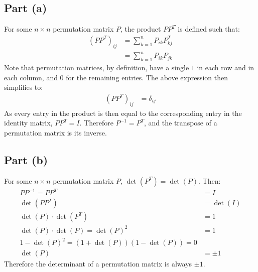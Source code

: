 \documentclass{article}
\begin{document}
\subsection*{Part (a)}
For some $n \times n$ permutation matrix $P$, the product $PP^T$ is defined such that:
\begin{equation}
    \begin{split}
        \left(PP^T\right)_{ij} & = \sum_{k=1}^n P_{ik}P^T_{kj} \\
        & = \sum_{k=1}^n P_{ik}P_{jk}
    \end{split}
\end{equation}
Note that permutation matrices, by definition, have a single $1$ in each row and in each column, and $0$ for the remaining entries. The above expression then simplifies to:
\begin{equation}
    \begin{split}
        \left(PP^T\right)_{ij} & = \delta_{ij}
    \end{split}
\end{equation}
As every entry in the product is then equal to the corresponding entry in the identity matrix, $PP^T = I$. Therefore $P^{-1} = P^T$, and the transpose of a permutation matrix is its inverse.
\subsection*{Part (b)}
For some $n \times n$ permutation matrix $P$, $\det\left(P^T\right) = \det\left(P\right)$.
Then:
\begin{equation}
    \begin{split}
        PP^{-1} = PP^T & = I \\
        \det\left(PP^T\right) & = \det\left(I\right) \\
        \det\left(P\right) \cdot \det\left(P^T\right) & = 1 \\
        \det\left(P\right) \cdot \det\left(P\right) = \det\left(P\right)^2 & = 1 \\
        1 - \det\left(P\right)^2 = \left(1 + \det\left(P\right)\right)\left(1 - \det\left(P\right)\right) = 0 \\
        \det\left(P\right) & = \pm 1
    \end{split}
\end{equation}
Therefore the determinant of a permutation matrix is always $\pm 1$.
\end{document}
